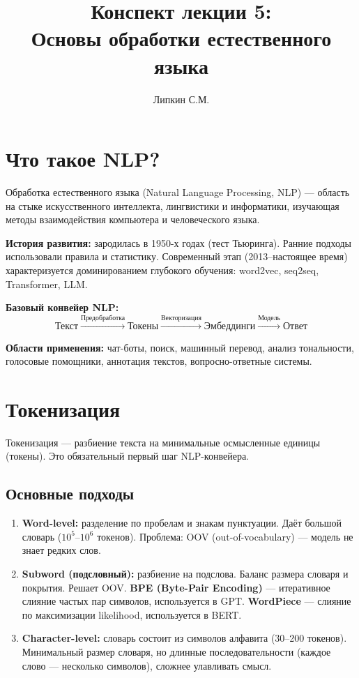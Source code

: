 \documentclass[a4paper,12pt]{article}
\title{Конспект лекции 5: \\ Основы обработки естественного языка}
\author{Липкин С.М.}
\date{}
\begin{document}
\maketitle

\section{Что такое NLP?}

Обработка естественного языка (Natural Language Processing, NLP) — область на стыке искусственного интеллекта, лингвистики и информатики, изучающая методы взаимодействия компьютера и человеческого языка.

\textbf{История развития:} зародилась в 1950-х годах (тест Тьюринга). Ранние подходы использовали правила и статистику. Современный этап (2013--настоящее время) характеризуется доминированием глубокого обучения: word2vec, seq2seq, Transformer, LLM.

\textbf{Базовый конвейер NLP:}
\[
\text{Текст} \xrightarrow{\text{Предобработка}} \text{Токены} \xrightarrow{\text{Векторизация}} \text{Эмбеддинги} \xrightarrow{\text{Модель}} \text{Ответ}
\]

\textbf{Области применения:} чат-боты, поиск, машинный перевод, анализ тональности, голосовые помощники, аннотация текстов, вопросно-ответные системы.

\section{Токенизация}

Токенизация — разбиение текста на минимальные осмысленные единицы (токены). Это обязательный первый шаг NLP-конвейера.

\subsection{Основные подходы}

\begin{enumerate}
    \item \textbf{Word-level:} разделение по пробелам и знакам пунктуации. Даёт большой словарь ($10^5$--$10^6$ токенов). Проблема: OOV (out-of-vocabulary) — модель не знает редких слов.
    
    \item \textbf{Subword (подсловный):} разбиение на подслова. Баланс размера словаря и покрытия. Решает OOV. \textbf{BPE (Byte-Pair Encoding)} — итеративное слияние частых пар символов, используется в GPT. \textbf{WordPiece} — слияние по максимизации likelihood, используется в BERT.
    
    \item \textbf{Character-level:} словарь состоит из символов алфавита (30--200 токенов). Минимальный размер словаря, но длинные последовательности (каждое слово — несколько символов), сложнее улавливать смысл.
\end{enumerate}
\end{document}
